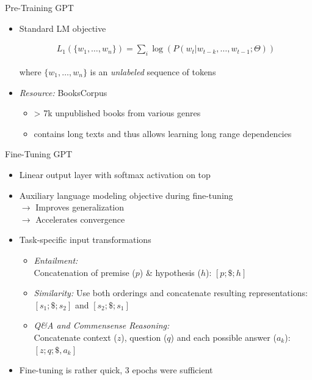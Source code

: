 \begin{frame}{Pre-Training GPT}

\vfill

\begin{itemize}
		\item Standard LM objective

\begin{align*}
	L_1(\{w_1, \hdots, w_n\}) = \sum_i \log(P(w_t | w_{t-k}, \hdots, w_{t-1}; \Theta))
\end{align*}
					
					where $\{w_1, \hdots, w_n\}$ is an \textit{unlabeled} sequence of tokens

		\item \textit{Resource:} BooksCorpus 
			\begin{itemize}
				\item > 7k unpublished books from various genres
				\item contains long texts and thus allows learning long range dependencies
			\end{itemize}
\end{itemize}

\vfill

\end{frame}


\begin{frame}{Fine-Tuning GPT}

\vfill
			
\begin{itemize}
		\item Linear output layer with softmax activation on top
		\item Auxiliary language modeling objective during fine-tuning\\
					$\rightarrow$ Improves generalization\\
					$\rightarrow$ Accelerates convergence
		\item Task-specific input transformations
					\begin{itemize}
						\item \textit{Entailment:} \\ Concatenation of premise ($p$) \& hypothesis ($h$): $[p; \$; h]$
						\item \textit{Similarity:} Use both orderings and concatenate resulting representations: $[s_1; \$; s_2]$ and $[s_2; \$; s_1]$
						\item \textit{Q\&A and Commensense Reasoning:} \\ Concatenate context ($z$), question ($q$) and each possible answer ($a_k$): $[z; q; \$, a_k]$
					\end{itemize}
		\item Fine-tuning is rather quick, 3 epochs were sufficient
\end{itemize}

\vfill

\end{frame}

